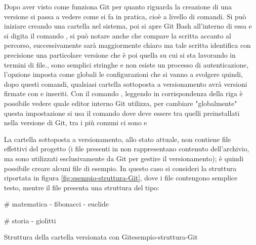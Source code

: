 Dopo aver visto come funziona Git per quanto riguarda la creazione di una versione si passa a vedere come si fa in pratica, cioè a livello di comandi. Si può iniziare creando una cartella nel sistema, poi si apre Git Bash all'interno di essa e si digita il comando , si può notare anche che compare la scritta  accanto al percorso, successivamente sarà maggiormente chiaro ma tale scritta identifica con precisione una particolare versione che è poi quella su cui si sta lavorando in termini di file., sono semplici stringhe e non esiste un processo di autenticazione, l'opzione  imposta come globali le configurazioni che si vanno a svolgere quindi, dopo questi comandi, qualsiasi cartella sottoposta a versionamento avrà versioni firmate con  e  inseriti. Con il comando , leggendo in corrispondenza della riga  è possibile vedere quale editor interno Git utilizza, per cambiare "globalmente" questa impostazione si usa il comando  dove  deve essere tra quelli preinstallati nella versione di Git, tra i più comuni ci sono  e 

La cartella sottoposta a versionamento, allo stato attuale, non contiene file effettivi del progetto (i file presenti in  non rappresentano contenuto dell'archivio, ma sono utilizzati esclusivamente da Git per gestire il versionamento); è quindi possibile creare alcuni file di esempio. 
In questo caso si consideri la struttura riportata in figura \ref{fig:esempio-struttura-Git}, dove i file  contengono semplice testo, mentre il file  presenta una struttura del tipo:

\begin{cmd}
	# matematica
	- fibonacci
	- euclide
	
	# storia
	- giolitti
\end{cmd}

\begin{figtree}{Struttura della cartella  versionata con Git}{esempio-struttura-Git}
\end{figtree}

